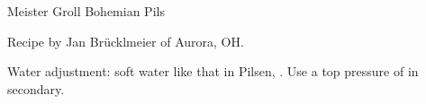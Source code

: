 \begin{recipe}{Meister Groll Bohemian Pils}

\begin{aboutblock}
Recipe by Jan Brücklmeier of Aurora, OH. \sourceaha
\end{aboutblock}


\begin{methodandtiming}
 
\begin{mashsteps}
\end{mashsteps}

\begin{fermentationsteps}
\end{fermentationsteps}

\begin{directions}
Water adjustment: soft water like that in Pilsen, .
Use a top pressure of  in secondary.
\end{directions}

\end{methodandtiming}

\recipebreak

\begin{ingredientsblock}

\begin{malts}
\end{malts}

\begin{hops}
\end{hops}


\end{ingredientsblock}

\end{recipe}
